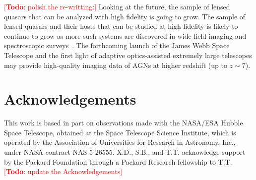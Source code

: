 \documentclass[fleqn,usenatbib]{mnras}
\newcommand{\lenstronomy}{{\sc Lenstronomy}}
\newcommand{\todo}[1]{\textcolor{red}{[{\bf Todo}: #1]}}
\begin{document}
\todo{polish the re-writting:} Looking at the future, the sample of lensed quasars that can be analyzed with high fidelity is going to grow. The sample of lensed quasars and their hosts that can be studied at high fidelity is likely to continue to grow as more such systems are discovered in wide field imaging and spectroscopic surveys~\citep[e.g.][]{Agn++15,Mor++16,Sch++16,Ost++17}. The forthcoming launch of the James Webb Space Telescope and the first light of adaptive optics-assisted extremely large telescopes may provide high-quality imaging data of AGNs at higher redshift (up to $z\sim7$).

\section*{Acknowledgements}

This work is based in part on observations made with the NASA/ESA Hubble Space Telescope, obtained at the Space Telescope Science Institute, which is operated by the Association of Universities for Research in Astronomy, Inc., under NASA contract NAS 5-26555. X.D., S.B., and T.T. acknowledge support by the Packard Foundation through a Packard Research fellowship to T.T. \todo{update the Acknowledgements}








\end{document}
